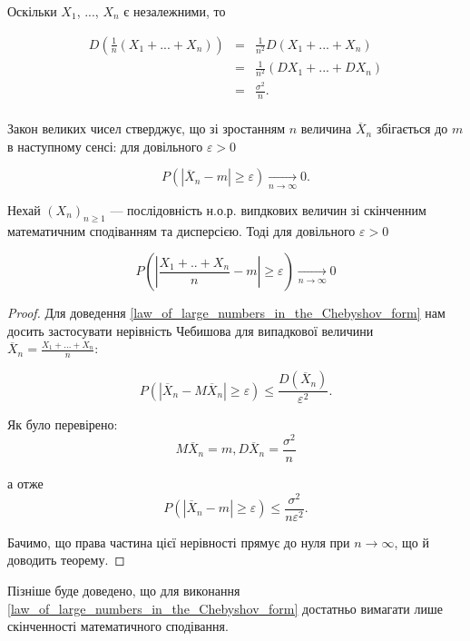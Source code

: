 Оскільки $X_1$, ..., $X_n$ є незалежними, то

$$\begin{array}{rcl}
    D(\frac{1}{n}(X_1 + ... + X_n)) & = & \frac{1}{n^2}D(X_1 + ... + X_n) \\
    & = & \frac{1}{n^2}(DX_1 + ... + DX_n) \\
    & = & \frac{\sigma^2}{n}. \\
\end{array}$$

Закон великих чисел стверджує, що зі зростанням $n$
величина $\overline{X}_n$ збігається до $m$ в
наступному сенсі:
для довільного $\varepsilon > 0$

$$P(|\overline{X}_n - m| \geqslant \varepsilon) \xrightarrow[n \rightarrow \infty]{} 0.$$

\begin{theorem}
    Нехай $(X_n)_{n \geqslant 1}$ --- послідовність
    н.о.р. випдкових величин зі
    скінченним математичним сподіванням та дисперсією.
    Тоді для довільного $\varepsilon > 0$
    
    \begin{equation}
        \label{law_of_large_numbers_in_the_Chebyshov_form}
        P\left(\left|\dfrac{X_1 + .. + X_n}{n} - m\right| \geqslant \varepsilon\right) \xrightarrow[n \rightarrow \infty]{} 0
    \end{equation}
\end{theorem}
\begin{proof}
    Для доведення \ref{law_of_large_numbers_in_the_Chebyshov_form}
    нам досить застосувати
    нерівність Чебишова для випадкової величини $\overline{X}_n = \frac{X_1 + ... + X_n}{n}$:
    
    $$P(|\overline{X}_n - M\overline{X}_n| \geqslant \varepsilon)
    \leqslant \dfrac{D(\overline{X}_n)}{\varepsilon^2}.$$
    
    Як було перевірено:
    $$M\overline{X}_n = m, D\overline{X}_n = \dfrac{\sigma^2}{n}$$
    
    а отже
    $$P(|\overline{X}_n - m| \geqslant \varepsilon) \leqslant \dfrac{\sigma^2}{n \varepsilon^2}.$$
    
    Бачимо, що права частина цієї нерівності прямує до нуля
    при $n \rightarrow \infty$, що й доводить теорему.
\end{proof}

\begin{remark}
    Пізніше буде доведено, що для виконання
    \ref{law_of_large_numbers_in_the_Chebyshov_form} достатньо
    вимагати лише скінченності
    математичного сподівання.
\end{remark}

